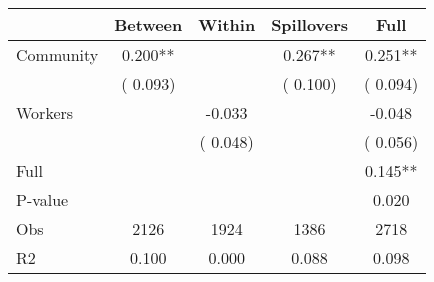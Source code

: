 
\begin{tabular}{l*{4}{c}}\hline&\multicolumn{1}{c}{Between}&\multicolumn{1}{c}{Within}&\multicolumn{1}{c}{Spillovers}&\multicolumn{1}{c}{Full}\\ \hline
 Community             &              0.200**      &                                               &        0.267** &         0.251**                            \\ 
                               &        (       0.093)           &                                       &       (       0.100)     &      (       0.094)                                           \\ 
 Workers       &                                               &       -0.033    &                                &            -0.048                            \\ 
                               &                                               & (       0.048)                  &                                        &      (       0.056)                                           \\ 
\hline                                                                                                                                                                                                                                            
 Full                  &                                               &                                               &                                        &             0.145**                                     \\ 
 P-value               &                                               &                                               &                                        &             0.020                                           \\ 
 Obs                   &               2126               &       1924                       &       1386                &              2718                                               \\ 
 R2                    &                      0.100              &              0.000                      &              0.088               &                     0.098                                              \\ 
\hline \end{tabular}                                                                                                                                                                                                              